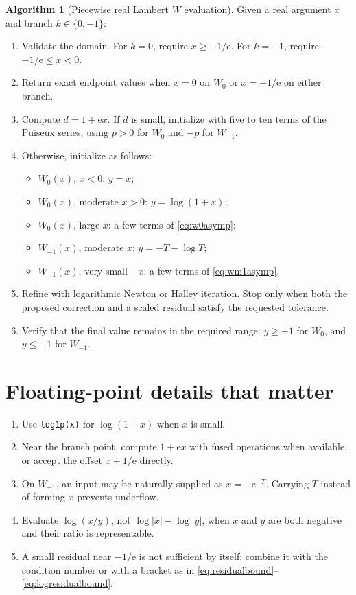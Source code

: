 \documentclass[11pt,openany]{book}
\newcommand{\e}{\mathrm{e}}
\newcommand{\abs}[1]{\left|#1\right|}
\theoremstyle{plain}
\theoremstyle{definition}
\newtheorem{algorithm}[theorem]{Algorithm}
\theoremstyle{remark}
\begin{document}
\begin{algorithm}[Piecewise real Lambert \(W\) evaluation]
\label{alg:realW}
Given a real argument \(x\) and branch \(k\in\{0,-1\}\):
\begin{enumerate}[label=\arabic*.]
\item Validate the domain.  For \(k=0\), require \(x\ge-1/\e\).  For
\(k=-1\), require \(-1/\e\le x<0\).
\item Return exact endpoint values when \(x=0\) on \(W_0\) or
\(x=-1/\e\) on either branch.
\item Compute \(d=1+\e x\).  If \(d\) is small, initialize with five to ten
terms of the Puiseux series, using \(p>0\) for \(W_0\) and \(-p\) for
\(W_{-1}\).
\item Otherwise, initialize as follows:
\begin{itemize}
\item \(W_0(x)\), \(x<0\): \(y=x\);
\item \(W_0(x)\), moderate \(x>0\): \(y=\log(1+x)\);
\item \(W_0(x)\), large \(x\): a few terms of \eqref{eq:w0asymp};
\item \(W_{-1}(x)\), moderate \(x\): \(y=-T-\log T\);
\item \(W_{-1}(x)\), very small \(-x\): a few terms of
\eqref{eq:wm1asymp}.
\end{itemize}
\item Refine with logarithmic Newton or Halley iteration.  Stop only when both
the proposed correction and a scaled residual satisfy the requested tolerance.
\item Verify that the final value remains in the required range:
\(y\ge-1\) for \(W_0\), and \(y\le-1\) for \(W_{-1}\).
\end{enumerate}
\end{algorithm}

\section{Floating-point details that matter}
\begin{enumerate}[label=\arabic*.]
\item Use \texttt{log1p(x)} for \(\log(1+x)\) when \(x\) is small.
\item Near the branch point, compute \(1+\e x\) with fused operations when
available, or accept the offset \(x+1/\e\) directly.
\item On \(W_{-1}\), an input may be naturally supplied as
\(x=-\e^{-T}\).  Carrying \(T\) instead of forming \(x\) prevents underflow.
\item Evaluate \(\log(x/y)\), not \(\log\abs{x}-\log\abs{y}\), when \(x\) and \(y\)
are both negative and their ratio is representable.
\item A small residual near \(-1/\e\) is not sufficient by itself; combine it
with the condition number or with a bracket as in
\eqref{eq:residualbound}--\eqref{eq:logresidualbound}.
\end{enumerate}
\end{document}
